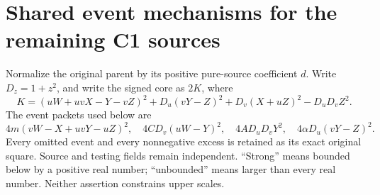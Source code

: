 \section{Shared event mechanisms for the remaining C1 sources}
\label{sec:r6-c1-common-remote}
Normalize the original parent by its positive pure-source coefficient $d$.
Write $D_z=1+z^2$, and write the signed core as $2K$, where
\[
 K=(uW+uvX-Y-vZ)^2+D_u(vY-Z)^2+D_v(X+uZ)^2-D_uD_vZ^2.
 \tag{CE1}
\]
The event packets used below are
\[
4m(vW-X+uvY-uZ)^2,\quad4CD_v(uW-Y)^2,
\quad4AD_uD_vY^2,\quad4\alpha D_u(vY-Z)^2.
\]
Every omitted event and every nonnegative excess is retained as its exact
original square. Source and testing fields remain independent. ``Strong''
means bounded below by a positive real number; ``unbounded'' means larger
than every real number. Neither assertion constrains upper scales.

